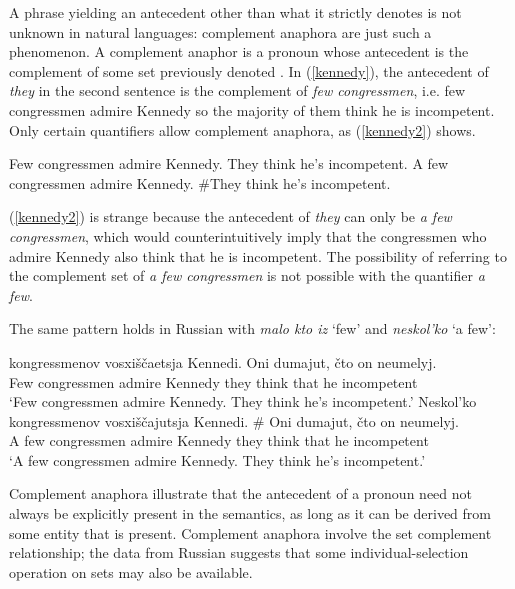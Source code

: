A phrase yielding an antecedent other than what it strictly denotes is not unknown in natural languages: complement anaphora are just such a phenomenon. A complement anaphor is a pronoun whose antecedent is the complement of some set previously denoted \citep{nouwen03, schwarz09}. In (\ref{kennedy}), the antecedent of \textit{they} in the second sentence is the complement of \textit{few congressmen}, i.e. few congressmen admire Kennedy so the majority of them think he is incompetent. Only certain quantifiers allow complement anaphora, as (\ref{kennedy2}) shows.

\begin{exe}
	\ex \label{kennedy} Few congressmen admire Kennedy. They think he's incompetent.
	\ex \label{kennedy2} A few congressmen admire Kennedy. \#They think he's incompetent.
\end{exe}

(\ref{kennedy2}) is strange because the antecedent of \textit{they} can only be \textit{a few congressmen}, which would counterintuitively imply that the congressmen who admire Kennedy also think that he is incompetent. The possibility of referring to the complement set of \textit{a few congressmen} is not possible with the quantifier \textit{a few}.

The same pattern holds in Russian with \textit{malo kto iz} `few' and \textit{neskol'ko} `a few':

\begin{exe}
	\ex {} kongressmenov vosxi\v{s}\v{c}aetsja Kennedi. Oni dumajut, \v{c}to on neumelyj.\\
	Few congressmen admire Kennedy they think that he incompetent\\
	\glt `Few congressmen admire Kennedy. They think he's incompetent.'
	\ex \gll Neskol'ko kongressmenov vosxi\v{s}\v{c}ajutsja Kennedi. \# Oni dumajut, \v{c}to on neumelyj.\\
	{A few} congressmen admire Kennedy {} they think that he incompetent\\
	\glt `A few congressmen admire Kennedy. They think he's incompetent.'
\end{exe}

Complement anaphora illustrate that the antecedent of a pronoun need not always be explicitly present in the semantics, as long as it can be derived from some entity that is present. Complement anaphora involve the set complement relationship; the data from Russian suggests that some individual-selection operation on sets may also be available.

